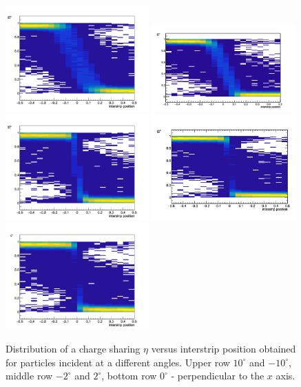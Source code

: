  
 
\begin{figure}[tbph]
\begin{center}
\includegraphics[width = 0.49\textwidth]{figures/eta/eta_2d_10.png} 
\includegraphics[width = 0.49\textwidth]{figures/eta/eta_2d_neg10.png}
\includegraphics[width = 0.49\textwidth]{figures/eta/eta_2d_2.png} 
\includegraphics[width = 0.49\textwidth]{figures/eta/eta_2d_neg2.png} 
\includegraphics[width = 0.49\textwidth]{figures/eta/eta_2d_0.png} 

\caption{Distribution of a charge sharing $\eta$ versus interstrip position obtained for particles incident at a different angles. Upper row $10^{\circ}$ and $-10^{\circ}$, middle row $-2^{\circ}$ and $2^{\circ}$, bottom row $0^{\circ}$ - perpendicular to the $x$ axis.    }
\label{fig:eta_distribution_2d}
 \end{center}
 \end{figure}
 
